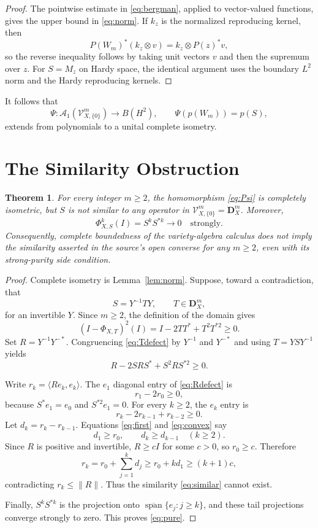 \documentclass[11pt]{article}
\newtheorem{theorem}{Theorem}
\newcommand{\Ac}{\mathcal A}
\begin{document}
\begin{proof}
The pointwise estimate in \eqref{eq:bergman}, applied to vector-valued
functions, gives the upper bound in \eqref{eq:norm}.  If $k_z$ is the
normalized reproducing kernel, then
\[
 P(W_m)^*(k_z\otimes v)=k_z\otimes P(z)^*v,
\]
so the reverse inequality follows by taking unit vectors $v$ and then the
supremum over $z$.  For $S=M_z$ on Hardy space, the identical argument uses
the boundary $L^2$ norm and the Hardy reproducing kernels.
\end{proof}

It follows that
\[
 \Psi:\Ac_1(\mathcal V_{X,\{0\}}^m)\longrightarrow B(H^2),
 \qquad \Psi(p(W_m))=p(S),
 \tag{6}\label{eq:Psi}
\]
extends from polynomials to a unital complete isometry.

\section*{The Similarity Obstruction}

\begin{theorem}\label{thm:main}
For every integer $m\geq2$, the homomorphism \eqref{eq:Psi} is completely
isometric, but $S$ is not similar to any operator in
$\mathcal V_{X,\{0\}}^m=\mathbf D_X^m$.  Moreover,
\[
 \Phi_{X,S}^k(I)=S^kS^{*k}\longrightarrow0
 \quad\text{strongly}.
 \tag{7}\label{eq:pure}
\]
Consequently, complete boundedness of the variety-algebra calculus does not
imply the similarity asserted in the source's open converse for any
$m\geq2$, even with its strong-purity side condition.
\end{theorem}

\begin{proof}
Complete isometry is Lemma~\ref{lem:norm}.  Suppose, toward a contradiction,
that
\[
 S=Y^{-1}TY,\qquad T\in\mathbf D_X^m,
 \tag{8}\label{eq:similar}
\]
for an invertible $Y$.  Since $m\geq2$, the definition of the domain gives
\[
 (I-\Phi_{X,T})^2(I)=I-2TT^*+T^2T^{*2}\geq0.
 \tag{9}\label{eq:Tdefect}
\]
Set $R=Y^{-1}Y^{-*}$.  Congruencing \eqref{eq:Tdefect} by $Y^{-1}$
and $Y^{-*}$ and using $T=YSY^{-1}$ yields
\[
 R-2SRS^*+S^2RS^{*2}\geq0.
 \tag{10}\label{eq:Rdefect}
\]

Write $r_k=\langle Re_k,e_k\rangle$.  The $e_1$ diagonal entry of
\eqref{eq:Rdefect} is
\[
 r_1-2r_0\geq0,
 \tag{11}\label{eq:first}
\]
because $S^*e_1=e_0$ and $S^{*2}e_1=0$.  For every $k\geq2$, the
$e_k$ entry is
\[
 r_k-2r_{k-1}+r_{k-2}\geq0.
 \tag{12}\label{eq:convex}
\]
Let $d_k=r_k-r_{k-1}$.  Equations \eqref{eq:first} and
\eqref{eq:convex} say
\[
 d_1\geq r_0,
 \qquad d_k\geq d_{k-1}\quad(k\geq2).
\]
Since $R$ is positive and invertible, $R\geq cI$ for some $c>0$, so
$r_0\geq c$.  Therefore
\[
 r_k=r_0+\sum_{j=1}^k d_j
     \geq r_0+kd_1\geq(k+1)c,
 \tag{13}\label{eq:growth}
\]
contradicting $r_k\leq\|R\|$.  Thus the similarity \eqref{eq:similar}
cannot exist.

Finally, $S^kS^{*k}$ is the projection onto
$\overline{\operatorname{span}}\{e_j:j\geq k\}$, and these tail
projections converge strongly to zero.  This proves \eqref{eq:pure}.
\end{proof}
\end{document}
